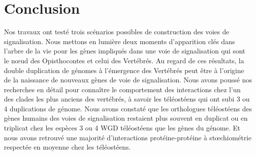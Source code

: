 \chapter{Conclusion}
\thispagestyle{firstpage}
\onehalfspacing

\par Nos travaux ont testé trois scénarios possibles de construction des voies de signalisation. Nous mettons en lumière deux moments d’apparition clés dans l’arbre de la vie pour les gènes impliqués dans une voie de signalisation qui sont le nœud des Opisthocontes et celui des Vertébrés. Au regard de ces résultats, la double duplication de génomes à l’émergence des Vertébrés peut être à l’origine de la naissance de nouveaux gènes de voie de signalisation. Nous avons poussé nos recherches en détail pour connaître le comportement des interactions chez l'un des clades les plus anciens des vertébrés, à savoir les téléostéens qui ont subi 3 ou 4 duplications de génome. Nous avons constaté que les orthologues téléostéens des gènes humains des voies de signalisation restaient plus souvent en duplicat ou en triplicat chez les espèces 3 ou 4 WGD téléostéens que les gènes du génome. Et nous avons retrouvé une majorité d’interactions protéine-protéine à stœchiométrie respectée en moyenne chez les téléostéens.
